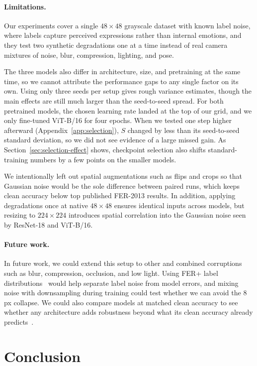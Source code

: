 \documentclass{article}
\begin{document}
\paragraph{Limitations.}
Our experiments cover a single $48{\times}48$ grayscale dataset with known label noise, where labels capture perceived
expressions rather than internal emotions, and they test two synthetic degradations one at a time instead of real camera
mixtures of noise, blur, compression, lighting, and pose.

The three models also differ in architecture, size, and pretraining at the same time, so we cannot attribute the
performance gaps to any single factor on its own. Using only three seeds per setup gives rough variance estimates,
though the main effects are still much larger than the seed-to-seed spread. For both pretrained models, the chosen
learning rate landed at the top of our grid, and we only fine-tuned ViT-B/16 for four epochs. When we tested one step
higher afterward (Appendix~\ref{app:selection}), $S$ changed by less than its seed-to-seed standard deviation, so we did
not see evidence of a large missed gain. As Section~\ref{sec:selection-effect} shows, checkpoint selection also shifts standard-training
numbers by a few points on the smaller models.

We intentionally left out spatial augmentations such as flips and crops so that Gaussian noise would be the sole
difference between paired runs, which keeps clean accuracy below top published FER-2013 results. In addition, applying
degradations once at native $48{\times}48$ ensures identical inputs across models, but resizing to $224{\times}224$
introduces spatial correlation into the Gaussian noise seen by ResNet-18 and ViT-B/16.

\paragraph{Future work.}
In future work, we could extend this setup to other and combined corruptions such as blur, compression, occlusion, and
low light. Using FER+ label distributions~\cite{barsoum2016ferplus} would help separate label noise from model errors,
and mixing noise with downsampling during training could test whether we can avoid the 8\,px collapse. We could also
compare models at matched clean accuracy to see whether any architecture adds robustness beyond what its clean accuracy
already predicts~\cite{taori2020measuring}.

\section{Conclusion}
\label{sec:conclusion}
\end{document}
